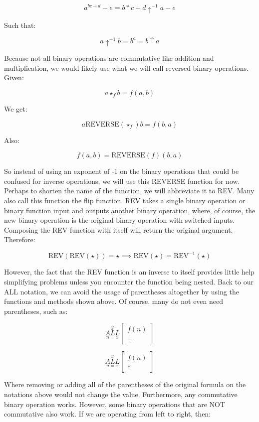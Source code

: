 \documentclass{article}
\begin{document}
$$a^{bc+d}-e=b*c+d \uparrow^{-1} a - e$$

Such that:

$$a \uparrow^{-1} b = b^a = b \uparrow a$$

Because not all binary operations are commutative like addition and multiplication, we would likely use what we will call reversed binary operations. Given:

$$a \star_f b = f(a,b)$$

We get:

$$a \text{REVERSE}(\star_f) b = f(b,a)$$

Also:

$$f(a,b)=\text{REVERSE}(f)(b,a)$$

So instead of using an exponent of -1 on the binary operations that could be confused for inverse operations, we will use this REVERSE function for now. Perhaps to shorten the name of the function, we will abbreviate it to REV. Many also call this function the flip function. REV takes a single binary operation or binary function input and outputs another binary operation, where, of course, the new binary operation is the original binary operation with switched inputs. Composing the REV function with itself will return the original argument. Therefore:

$$\text{REV}(\text{REV}(\star))=\star \implies \text{REV}(\star) = \text{REV}^{-1}(\star)$$

However, the fact that the REV function is an inverse to itself provides little help simplifying problems unless you encounter the function being nested. Back to our ALL notation, we can avoid the usage of parentheses altogether by using the functions and methods shown above. Of course, many do not even need parentheses, such as:

$$\underset{n=x}{\overset{y}{ALL}}
\begin{bmatrix}
f(n) \\
+
\end{bmatrix}$$

$$\underset{n=x}{\overset{y}{ALL}}
\begin{bmatrix}
f(n) \\
*
\end{bmatrix}$$

Where removing or adding all of the parentheses of the original formula on the notations above would not change the value. Furthermore, any commutative binary operation works. However, some binary operations that are NOT commutative also work. If we are operating from left to right, then:
\end{document}
